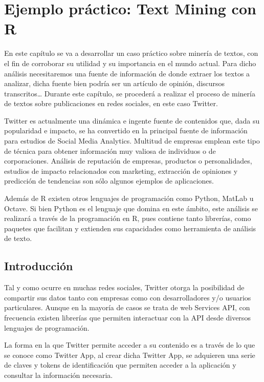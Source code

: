 
\chapter{Ejemplo práctico: Text Mining con R}
\label{cha:Text-mining-r}

En este capítulo se va a desarrollar un caso práctico sobre minería de textos, con el fin de corroborar 
su utilidad y su importancia en el mundo actual. Para dicho análisis necesitaremos una fuente de 
información de donde extraer los textos a analizar, dicha fuente bien podría ser un artículo de opinión, 
discursos transcritos… Durante este capítulo, se procederá a realizar el proceso de minería de textos 
sobre publicaciones en redes sociales, en este caso Twitter.

Twitter es actualmente una dinámica e ingente fuente de contenidos que, dada su popularidad e impacto, 
se ha convertido en la principal fuente de información para estudios de Social Media Analytics. Multitud 
de empresas emplean este tipo de técnica para obtener información muy valiosa de individuos o de 
corporaciones. Análisis de reputación de empresas, productos o personalidades, estudios de impacto 
relacionados con marketing, extracción de opiniones y predicción de tendencias son sólo algunos ejemplos 
de aplicaciones.

Además de R existen otros lenguajes de programación como Python, MatLab u Octave. Si bien Python es el 
lenguaje que domina en este ámbito, este análisis se realizará a través de la programación en R, pues 
contiene tanto librerías, como paquetes que facilitan y extienden sus capacidades como herramienta de 
análisis de texto.


\section{Introducción}
\label{sec:introduccion}

Tal y como ocurre en muchas redes sociales, Twitter otorga la posibilidad de compartir sus datos tanto 
con empresas como con desarrolladores y/o usuarios particulares. Aunque en la mayoría de casos se trata 
de web Services API, con frecuencia existen librerías que permiten interactuar con la API desde diversos 
lenguajes de programación. 

La forma en la que Twitter permite acceder a su contenido es a través de lo que se conoce como Twitter 
App, al crear dicha Twitter App, se adquieren una serie de claves y tokens de identificación que 
permiten acceder a la aplicación y consultar la información necesaria.  

